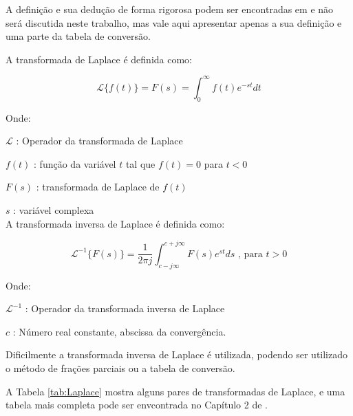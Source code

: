 A definição e sua dedução de forma rigorosa podem ser encontradas em \cite{Ogata} e não será discutida neste trabalho, mas vale aqui apresentar apenas a sua definição e uma parte da tabela de conversão.

A transformada de Laplace é definida como:

\begin{equation}
\mathscr{L}\{f(t)\} = F(s) = \int_{0}^{\infty} f(t) e^{-st} dt
\label{eq:transfLaplace}
\end{equation} 

Onde:

\setlength{\parindent}{2cm}
$\mathscr{L}$ : Operador da transformada de Laplace 

$f(t)$ : função da variável $t$ tal que $f(t) = 0$ para $t < 0$ 

$F(s)$ : transformada de Laplace de $f(t)$

$s$ : variável complexa
\\

\setlength{\parindent}{0cm}
A transformada inversa de Laplace é definida como:

\begin{equation}
\mathscr{L}^{-1} \{F(s)\} =  \frac{1}{2 \pi j} \int_{c-j\infty}^{c+j\infty}F(s) e^{st} ds  \text{ , para } t > 0
\label{eq:transfInvLaplace}
\end{equation}

Onde:

\setlength{\parindent}{2cm}
$\mathscr{L}^{-1}$ : Operador da transformada inversa de Laplace

$c$ : Número real constante, abscissa da convergência.


\setlength{\parindent}{0cm}

Dificilmente a transformada inversa de Laplace é utilizada, podendo ser utilizado o método de frações parciais ou a tabela de conversão.

A Tabela \ref{tab:Laplace} mostra alguns pares de transformadas de Laplace, e uma tabela mais completa pode ser envcontrada no Capítulo 2 de \cite{Ogata}. 

